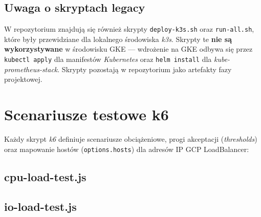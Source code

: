 



\subsection{Uwaga o skryptach legacy}

W repozytorium znajdują się również skrypty \texttt{deploy-k3s.sh} oraz \texttt{run-all.sh}, które były przewidziane dla lokalnego środowiska \textit{k3s}. Skrypty te \textbf{nie są wykorzystywane} w środowisku GKE — wdrożenie na GKE odbywa się przez \texttt{kubectl apply} dla manifestów \textit{Kubernetes} oraz \texttt{helm install} dla \textit{kube-prometheus-stack}. Skrypty pozostają w repozytorium jako artefakty fazy projektowej.

\section{Scenariusze testowe k6}

Każdy skrypt \textit{k6} definiuje scenariusze obciążeniowe, progi akceptacji (\textit{thresholds}) oraz mapowanie hostów (\texttt{options.hosts}) dla adresów IP GCP LoadBalancer:

\subsection{cpu-load-test.js}



\subsection{io-load-test.js}



